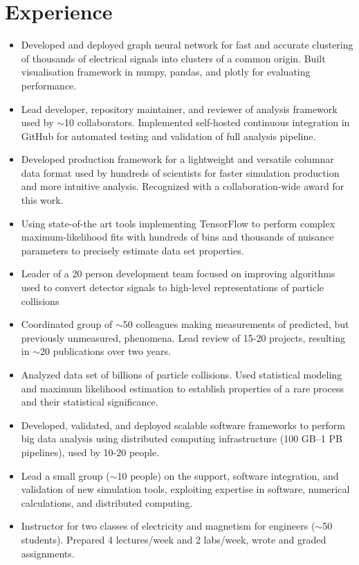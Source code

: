 \documentclass[9pt,a4paper]{moderncv}
\begin{document}
\section{Experience}
{
\begin{itemize}
    \item Developed and deployed graph neural network for fast and accurate clustering of thousands of electrical signals into clusters of a common origin. Built visualisation framework in numpy, pandas, and plotly for evaluating performance.
    \item Lead developer, repository maintainer, and reviewer of analysis framework used by $\sim$10 collaborators. Implemented self-hosted continuous integration in GitHub for automated testing and validation of full analysis pipeline.
    \item Developed production framework for a lightweight and versatile columnar data format used by hundreds of scientists for faster simulation production and more intuitive analysis. Recognized with a collaboration-wide award for this work.
    \item Using state-of-the art tools implementing TensorFlow to perform complex maximum-likelihood fits with hundreds of bins and thousands of nuisance parameters to precisely estimate data set properties.
    \item Leader of a 20 person development team focused on improving algorithms used to convert detector signals to high-level representations of particle collisions
    \item Coordinated group of $\sim$50 colleagues making measurements of predicted, but previously unmeasured, phenomena. Lead review of 15-20 projects, resulting in $\sim$20 publications over two years.
\end{itemize}
}

{
\begin{itemize}
    \item Analyzed data set of billions of particle collisions. Used statistical modeling and maximum likelihood estimation to establish properties of a rare process and their statistical significance.
    \item Developed, validated, and deployed scalable software frameworks to perform big data analysis using
distributed computing infrastructure (100 GB--1 PB pipelines), used by 10-20 people.
    \item Lead a small group ($\sim$10 people) on the support, software integration, and validation of new simulation tools, exploiting expertise in software, numerical calculations, and distributed computing.
    \item Instructor for two classes of electricity and magnetism for engineers ($\sim$50 students). Prepared 4 lectures/week and 2 labs/week, wrote and graded assignments.
\end{itemize}
}
\end{document}
